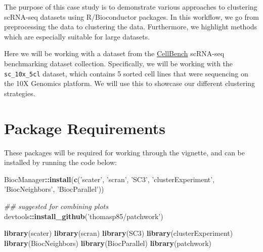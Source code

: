 \documentclass[]{book}
\newenvironment{Shaded}{\begin{snugshade}}{\end{snugshade}}
\newcommand{\CommentTok}[1]{\textcolor[rgb]{0.56,0.35,0.01}{\textit{#1}}}
\newcommand{\KeywordTok}[1]{\textcolor[rgb]{0.13,0.29,0.53}{\textbf{#1}}}
\newcommand{\NormalTok}[1]{#1}
\newcommand{\OperatorTok}[1]{\textcolor[rgb]{0.81,0.36,0.00}{\textbf{#1}}}
\newcommand{\StringTok}[1]{\textcolor[rgb]{0.31,0.60,0.02}{#1}}
\begin{document}
The purpose of this case study is to demonstrate various approaches to clustering scRNA-seq datasets using R/Bioconductor packages. In this workflow, we go from preprocessing the data to clustering the data. Furthermore, we highlight methods which are especially suitable for large datasets.

Here we will be working with a dataset from the \href{https://github.com/LuyiTian/CellBench_data}{CellBench} scRNA-seq benchmarking dataset collection. Specifically, we will be working with the \texttt{sc\_10x\_5cl} dataset, which contains 5 sorted cell lines that were sequencing on the 10X Genomics platform. We will use this to showcase our different clustering strategies.

\hypertarget{package-requirements-1}{%
\section{Package Requirements}\label{package-requirements-1}}

These packages will be required for working through the vignette, and can be installed by running the code below:

\begin{Shaded}
\begin{Highlighting}[]
\NormalTok{BiocManager}\OperatorTok{::}\KeywordTok{install}\NormalTok{(}\KeywordTok{c}\NormalTok{(}\StringTok{'scater'}\NormalTok{, }\StringTok{'scran'}\NormalTok{,}
                      \StringTok{'SC3'}\NormalTok{, }\StringTok{'clusterExperiment'}\NormalTok{, }\StringTok{'BiocNeighbors'}\NormalTok{,}
                      \StringTok{'BiocParallel'}\NormalTok{))}

\CommentTok{## suggested for combining plots}
\NormalTok{devtools}\OperatorTok{::}\KeywordTok{install_github}\NormalTok{(}\StringTok{'thomasp85/patchwork'}\NormalTok{)}
\end{Highlighting}
\end{Shaded}

\begin{Shaded}
\begin{Highlighting}[]
\KeywordTok{library}\NormalTok{(scater)}
\KeywordTok{library}\NormalTok{(scran)}
\KeywordTok{library}\NormalTok{(SC3)}
\KeywordTok{library}\NormalTok{(clusterExperiment)}
\KeywordTok{library}\NormalTok{(BiocNeighbors)}
\KeywordTok{library}\NormalTok{(BiocParallel)}
\KeywordTok{library}\NormalTok{(patchwork)}
\end{Highlighting}
\end{Shaded}
\end{document}
